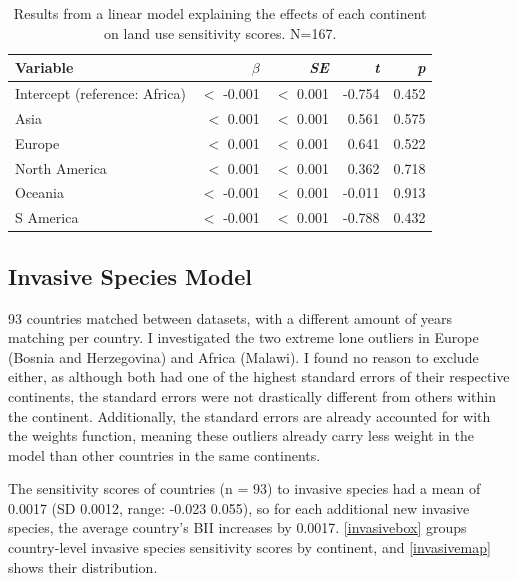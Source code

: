 \documentclass[11pt, a4paper, titlepage]{article}
\begin{document}
    \begin{table}[H]
    	\begin{center}
    		\caption{Results from a linear model explaining the effects of each continent on land use sensitivity scores. \textmd{N=167.}}
    		\label{tab:landuse}
    		\begin{tabular}{l|r|r|r|r} %
    			Variable & $\beta$ & \textit{SE} & \textit{t} & \textit{p}\\
    			\hline
    			Intercept (reference: Africa) & $<$ -0.001 & $<$ 0.001 & -0.754 & 0.452\\
    			Asia & $<$ 0.001 & $<$ 0.001 & 0.561 & 0.575\\
    			Europe & $<$ 0.001 & $<$ 0.001 & 0.641 & 0.522 \\
    			North America & $<$ 0.001 & $<$ 0.001 & 0.362 & 0.718\\
    			Oceania & $<$ -0.001 & $<$ 0.001 & -0.011 & 0.913\\
    			S America & $<$ -0.001 & $<$ 0.001 & -0.788 & 0.432\\
    		\end{tabular}
    	\end{center}
    \end{table}
    
    \bigskip
	\subsection*{Invasive Species Model}

	
	93 countries matched between datasets, with a different amount of years matching per country. I investigated the two extreme lone outliers in Europe  (Bosnia and Herzegovina) and Africa (Malawi). I found no reason to exclude either, as although both had one of the highest standard errors of their respective continents, the standard errors were not drastically different from others within the continent. Additionally, the standard errors are already accounted for with the weights function, meaning these outliers already carry less weight in the model than other countries in the same continents.
	
	The sensitivity scores of countries (n = 93) to invasive species had a mean of 0.0017 (SD 0.0012, range: -0.023  0.055), so for each additional new invasive species, the average country's BII increases by 0.0017. \autoref{invasivebox} groups country-level invasive species sensitivity scores by continent, and \autoref{invasivemap} shows their distribution. \newline
\end{document}
